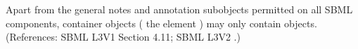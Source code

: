 Apart from the general notes and annotation subobjects permitted on all
SBML components, \ListOfModifierSpeciesReferences container objects (\ie
the \Reaction element ) may only contain
\ModifierSpeciesReference objects.  (References: SBML L3V1 Section 4.11; SBML L3V2
.)

